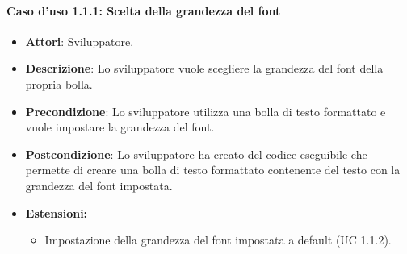 \paragraph{Caso d'uso 1.1.1: Scelta della grandezza del font}
\begin{itemize}
\item\textbf{Attori}: Sviluppatore.
\item\textbf{Descrizione}: Lo sviluppatore vuole scegliere la grandezza del font della propria bolla.
\item\textbf{Precondizione}: Lo sviluppatore utilizza una bolla di testo formattato e vuole impostare la grandezza del font.
\item\textbf{Postcondizione}: Lo sviluppatore ha creato del codice eseguibile che permette di creare una bolla di testo formattato contenente del testo con la grandezza del font impostata.
\item\textbf{Estensioni:}
	\begin{itemize}
		\item Impostazione della grandezza del font impostata a default (UC 1.1.2).
	\end{itemize}
\end{itemize}